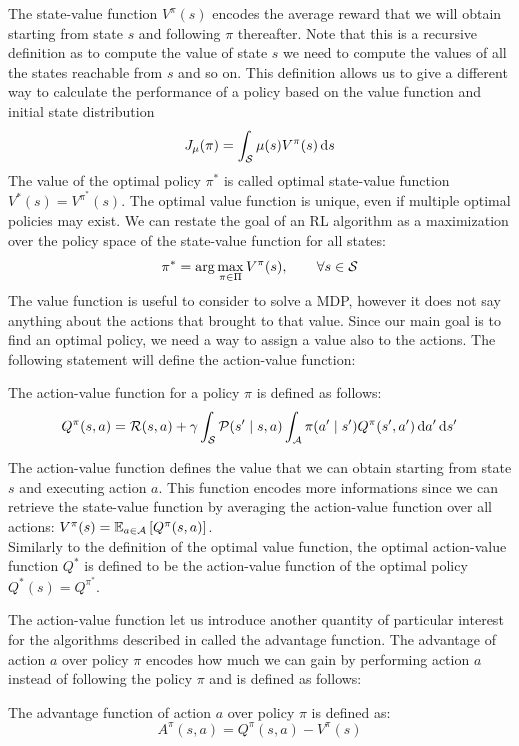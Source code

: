 The state-value function $V^\pi(s)$ encodes the average reward that we will obtain starting from state $s$ and following $\pi$ thereafter. Note that this is a recursive definition as to compute the value of state $s$ we need to compute the values of all the states reachable from $s$ and so on. This definition allows us to give a different way to calculate the performance of a policy based on the value function and initial state distribution
\[
J_\mu(\pi) = \int_{\sspace}\mu(s)V^\pi(s)\de s
\]
The value of the optimal policy $\pi^*$ is called optimal state-value function $V^*(s) = V^{\pi^*}(s)$. The optimal value function is unique, even if multiple optimal policies may exist. We can restate the goal of an RL algorithm as a maximization over the policy space of the state-value function for all states:
\[
\pi^* = \arg\max_{\pi \in \Pi} V^\pi(s),\qquad \forall s \in \sspace
\]
The value function is useful to consider to solve a MDP, however it does not say anything about the actions that brought to that value. Since our main goal is to find an optimal policy, we need a way to assign a value also to the actions. The following statement will define the action-value function:

\begin{definition}
The action-value function for a policy $\pi$ is defined as follows:
\[
Q^{\pi}(s, a) = \rfunc(s, a) + \gamma \int_{\sspace} \tfunc (s' \mid s, a) \int_{\aspace} \pi(a' \mid s') Q^{\pi} (s', a') \de a' \de s'
\]
\end{definition}

The action-value function defines the value that we can obtain starting from state $s$ and executing action $a$. This function encodes more informations since we can retrieve the state-value function by averaging the action-value function over all actions: $V^\pi(s) = \EV[a\in\aspace]{Q^\pi(s,a)}$. \\
Similarly to the definition of the optimal value function, the optimal action-value function $Q^*$ is defined to be the action-value function of the optimal policy $Q^*(s) = Q^{\pi^*}$. 

The action-value function let us introduce another quantity of particular interest for the algorithms described in  called the advantage function. The advantage of action $a$ over policy $\pi$ encodes how much we can gain by performing action $a$ instead of following the policy $\pi$ and is defined as follows:
\begin{definition}
The advantage function of action $a$ over policy $\pi$ is defined as:
\[
A^{\pi}(s,a) = Q^{\pi}(s,a) - V^{\pi}(s)
\]
\end{definition}

